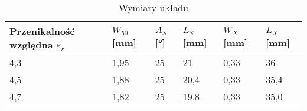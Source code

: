 \begin{table}[H]
\centering
\caption{Wymiary układu}
\label{TabWymiary}
\small
\begin{tabularx}{\textwidth}{ |X|X|X|X|X|X|}
\hline
Przenikalność względna $\varepsilon_r$ & $W_{50}$ [mm] & $A_{S}$ [°]& $L_S$ [mm]& $W_X$ [mm] & $L_X$ [mm] \\
  \hline
4,3 & 1,95 & 25 & 21 & 0,33 & 36\\
  \hline
4,5 & 1,88 & 25 & 20,4  & 0,33 & 35,4\\
  \hline
4,7 & 1,82 & 25 & 19,8 & 0,33 & 35,0\\
\hline
\end{tabularx}
\end{table}
